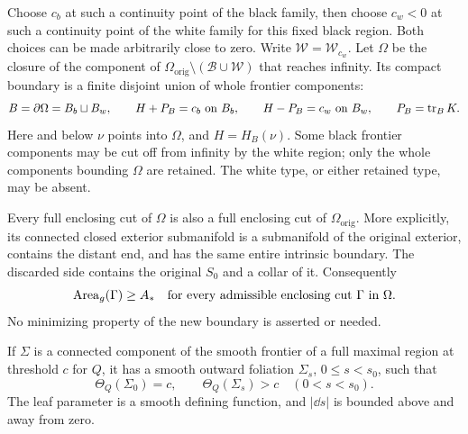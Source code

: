 Choose \(c_b\) at such a continuity point of the black family, then
choose \(c_w<0\) at such a continuity point of the white family for this
fixed black region.  Both choices can be made arbitrarily close to zero.
Write \(\mathcal W=\mathcal W_{c_w}\).  Let \(\Omega\) be the closure
of the component of
\(\Omega_{\mathrm{orig}}\setminus(\mathcal B\cup\mathcal W)\)
that reaches infinity.  Its compact boundary is a finite disjoint union
of whole frontier components:
\begin{equation}
\label{eq:fl-face-data}
 B=\partial\Omega=B_b\sqcup B_w,\qquad
 H+P_B=c_b\ \hbox{on }B_b,\qquad
 H-P_B=c_w\ \hbox{on }B_w,\qquad P_B=\operatorname{tr}_BK .
\end{equation}
Here and below \(\nu\) points into \(\Omega\), and \(H=H_B(\nu)\).
Some black frontier components may be cut off from infinity by the
white region; only the whole components bounding \(\Omega\) are retained.
The white type, or either retained type, may be absent.

Every full enclosing cut of \(\Omega\) is also a full enclosing cut of
\(\Omega_{\mathrm{orig}}\).  More explicitly, its connected closed
exterior submanifold is a submanifold of the original exterior, contains
the distant end, and has the same entire intrinsic boundary.  The
discarded side contains the original \(S_0\) and a collar of it.
Consequently
\begin{equation}
\label{eq:fl-cut-inclusion}
 \operatorname{Area}_g(\Gamma)\ge A_*
 \quad\hbox{for every admissible enclosing cut }\Gamma\hbox{ in }\Omega .
\end{equation}
No minimizing property of the new boundary is asserted or needed.

\begin{lemma}
\label{lem:fl-frontier-collars}
If \(\Sigma\) is a connected component of the smooth frontier of a full
maximal region at threshold \(c\) for \(Q\), it has a smooth outward
foliation \(\Sigma_s\), \(0\le s<s_0\), such that
\[
 \Theta_Q(\Sigma_0)=c,\qquad
 \Theta_Q(\Sigma_s)>c\quad(0<s<s_0).
\]
The leaf parameter is a smooth defining function, and
\(\lvert\dd s\rvert\) is bounded above and away from zero.
\end{lemma}


